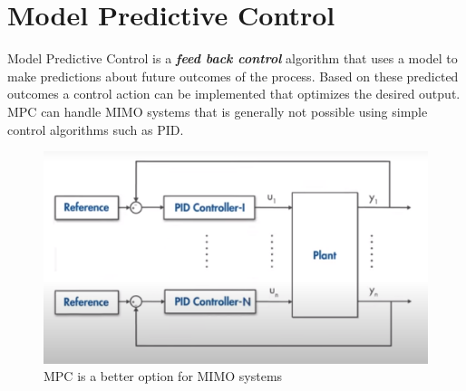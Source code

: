 \chapter{Model Predictive Control}

Model Predictive Control is a \textbf{\textit{feed back control}} algorithm that uses a model to make predictions about future outcomes of the process. Based on these predicted outcomes a control action can be implemented that optimizes the desired output. MPC can handle MIMO systems that is generally not possible using simple control algorithms such as PID. 

\begin{figure}[h!]
	\centering
	\includegraphics[width=\linewidth]{Bilder/Part2_MPC_MIMO_Application.PNG}
	\caption{MPC is a better option for MIMO systems}
\end{figure}

